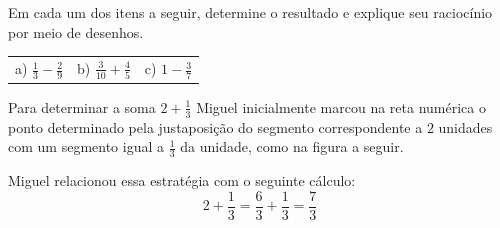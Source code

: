 \begin{atividade}{}

Em cada um dos itens a seguir, determine o resultado e explique seu raciocínio por meio de desenhos.

\begin{center}
  \begin{tabular}{m{}m{}m{}}
     a) $\frac{1}{3} - \frac{2}{9}$  &   b) $\frac{3}{10} + \frac{4}{5}$  &   c) $1 - \frac{3}{7}$
  \end{tabular}
\end{center}
\end{atividade}
\clearpage

\begin{atividade}{}
	Para determinar a soma $2 + \frac{1}{3}$ Miguel inicialmente marcou na reta numérica o ponto determinado pela justaposição do segmento correspondente a $2$ unidades com um segmento igual a $\frac{1}{3}$ da unidade, como na figura a seguir.

Miguel relacionou essa estratégia com o seguinte cálculo:
\[ 2 + \frac{1}{3} =  \frac{6}{3} + \frac{1}{3} = \frac{7}{3}\]

%


\begin{center}
\end{center}
\end{atividade}
